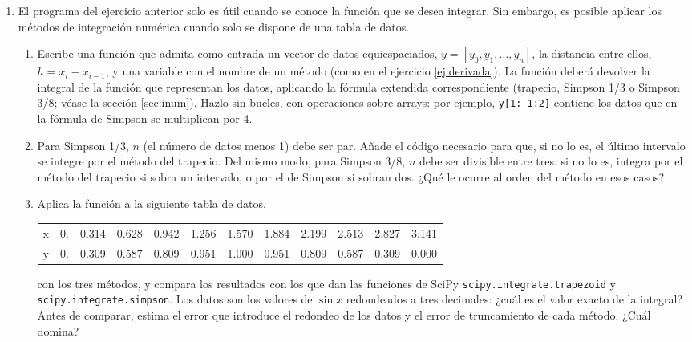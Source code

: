 \begin{enumerate}
\item \label{ej:integra_tabla} El programa del ejercicio anterior solo es útil cuando se conoce la función que se desea integrar. Sin embargo, es posible aplicar los métodos de integración numérica cuando solo se dispone de una tabla de datos.
\begin{enumerate}
\item Escribe una función que admita como entrada un vector de datos equiespaciados, $y=[y_0,y_1,\dots,y_n]$, la distancia entre ellos, $h=x_i - x_{i-1}$, y una variable con el nombre de un método (como en el ejercicio \ref{ej:derivada}). La función deberá devolver la integral de la función que representan los datos, aplicando la fórmula extendida correspondiente (trapecio, Simpson 1/3 o Simpson 3/8; véase la sección \ref{sec:inum}). Hazlo sin bucles, con operaciones sobre arrays: por ejemplo, \texttt{y[1:-1:2]} contiene los datos que en la fórmula de Simpson se multiplican por 4.
\item Para Simpson 1/3, $n$ (el número de datos menos 1) debe ser par. Añade el código necesario para que, si no lo es, el último intervalo se integre por el método del trapecio. Del mismo modo, para Simpson 3/8, $n$ debe ser divisible entre tres: si no lo es, integra por el método del trapecio si sobra un intervalo, o por el de Simpson si sobran dos. ¿Qué le ocurre al orden del método en esos casos?
\item Aplica la función a la siguiente tabla de datos,

\smallskip
{\small\begin{tabular}{r r r r r r r r r r r r}
\hline
x & 0. &0.314 & 	0.628 &	0.942 &	1.256 &	1.570 &	1.884 &	 2.199 &	2.513 &	 2.827 &	3.141\\
y & 0. &0.309 &	0.587 &	0.809 &	0.951 &	1.000 &	0.951 &    0.809 &	0.587 &	0.309 &	0.000\\
\hline
\end{tabular}}
\smallskip

\noindent con los tres métodos, y compara los resultados con los que dan las funciones de SciPy \texttt{scipy.integrate.trapezoid} y \texttt{scipy.integrate.simpson}. Los datos son los valores de $\sin x$ redondeados a tres decimales: ¿cuál es el valor exacto de la integral? Antes de comparar, estima el error que introduce el redondeo de los datos y el error de truncamiento de cada método. ¿Cuál domina?
\end{enumerate}


\end{enumerate}
